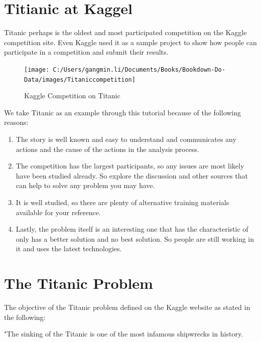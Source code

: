 \documentclass[
]{book}
\providecommand{\tightlist}{%
  \setlength{\itemsep}{0pt}\setlength{\parskip}{0pt}}
\begin{document}
\hypertarget{titianic-at-kaggel}{%
\section{Titianic at Kaggel}\label{titianic-at-kaggel}}

Titanic perhaps is the oldest and most participated competition on the Kaggle competition site. Even Kaggle used it as a sample project to show how people can participate in a competition and submit their results.

\begin{figure}

{\centering \texttt{[image: C:/Users/gangmin.li/Documents/Books/Bookdown-Do-Data/images/Titaniccompetition]} 

}

\caption{Kaggle Competition on Titanic}\label{fig:unnamed-chunk-3}
\end{figure}

We take Titanic as an example through this tutorial because of the following reasons:

\begin{enumerate}
\def\labelenumi{\arabic{enumi}.}
\tightlist
\item
  The story is well known and easy to understand and communicates any actions and the cause of the actions in the analysis process.
\item
  The competition has the largest participants, so any issues are most likely have been studied already. So explore the discussion and other sources that can help to solve any problem you may have.
\item
  It is well studied, so there are plenty of alternative training materials available for your reference.
\item
  Lastly, the problem itself is an interesting one that has the characteristic of only has a better solution and no best solution. So people are still working in it and uses the latest technologies.
\end{enumerate}

\hypertarget{the-titanic-problem}{%
\section{The Titanic Problem}\label{the-titanic-problem}}

The objective of the Titanic problem defined on the Kaggle website as stated in the following:

"The sinking of the Titanic is one of the most infamous shipwrecks in history.
\end{document}
